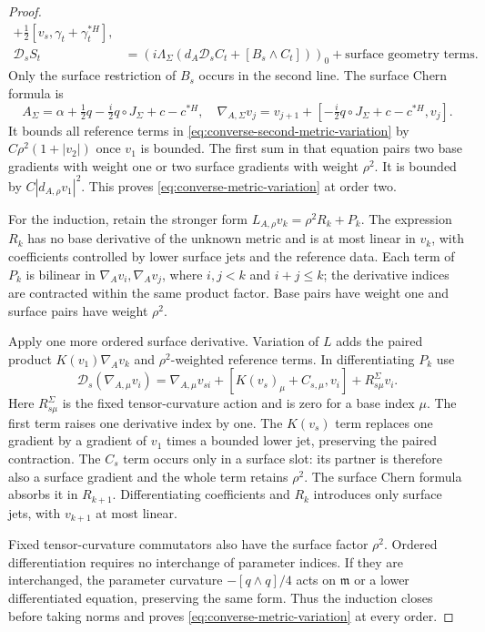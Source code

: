 \documentclass[11pt]{amsart}
\theoremstyle{definition}
\theoremstyle{remark}
\theoremstyle{plain}
\begin{document}
\begin{proof}
\[\begin{split}
       +\tfrac12[v_s,\gamma_t+\gamma_t^{*H}],\\
 \mathcal D_sS_t
   &=(i\Lambda_\Sigma
       (d_A\mathcal D_sC_t+[B_s\wedge C_t]))_0
        +\text{surface geometry terms}.
\end{split}
\]
Only the surface restriction of $B_s$ occurs in the
second line.
The surface Chern formula is
\[
 A_\Sigma=\alpha+\tfrac12q-\tfrac i2q\circ J_\Sigma+c-c^{*H},
 \quad
 \nabla_{A,\Sigma}v_j
   =v_{j+1}+[-\tfrac i2q\circ J_\Sigma+c-c^{*H},v_j].
\]
It bounds all reference terms in
\eqref{eq:converse-second-metric-variation} by
$C\rho^2(1+|v_2|)$ once $v_1$ is bounded.
The first sum in that equation pairs two base gradients with
weight one or two surface gradients with weight $\rho^2$.
It is bounded by $C|d_{A,\rho}v_1|^2$. This proves
\eqref{eq:converse-metric-variation} at order two.

For the induction, retain the stronger form
$L_{A,\rho}v_k=\rho^2R_k+P_k$.
The expression $R_k$ has no base derivative of the unknown
metric and is at most linear in $v_k$, with coefficients
controlled by lower surface jets and the reference data.
Each term of $P_k$ is bilinear in
$\nabla_Av_i,\nabla_Av_j$, where $i,j<k$ and $i+j\leq k$;
the derivative indices are contracted within the same
product factor. Base pairs have weight one and surface
pairs have weight $\rho^2$.

Apply one more ordered surface derivative. Variation of $L$
adds the paired product $K(v_1)\nabla_Av_k$ and
$\rho^2$-weighted reference terms. In differentiating $P_k$ use
\[
 \mathcal D_s(\nabla_{A,\mu}v_i)
   =\nabla_{A,\mu}v_{si}+[K(v_s)_\mu+C_{s,\mu},v_i]
        +R^\Sigma_{s\mu}v_i.
\]
Here $R^\Sigma_{s\mu}$ is the fixed tensor-curvature
action and is zero for a base index $\mu$.
The first term raises one derivative index by one.
The $K(v_s)$ term replaces one gradient by a gradient of
$v_1$ times a bounded lower jet, preserving the paired
contraction. The $C_s$ term occurs only in a surface slot:
its partner is therefore also a surface gradient and the
whole term retains $\rho^2$. The surface Chern formula
absorbs it in $R_{k+1}$.
Differentiating coefficients and $R_k$ introduces only
surface jets, with $v_{k+1}$ at most linear.

Fixed tensor-curvature commutators also have the surface
factor $\rho^2$. Ordered differentiation requires no
interchange of parameter indices. If they are interchanged,
the parameter curvature $-[q\wedge q]/4$ acts on
$\mathfrak m$ or a lower differentiated equation,
preserving the same form. Thus the induction closes
before taking norms and proves
\eqref{eq:converse-metric-variation} at every order.


\end{proof}
\end{document}
